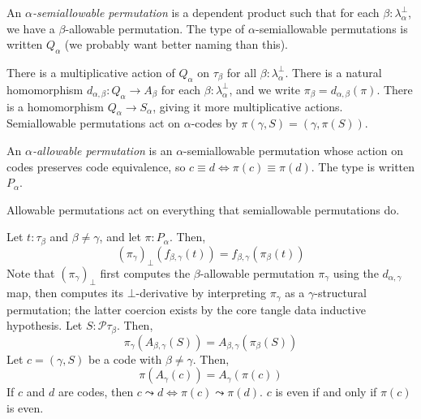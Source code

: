 \documentclass{article}
\begin{document}
\begin{definition}
    An \emph{\( \alpha \)-semiallowable permutation} is a dependent product such that for each \( \beta : \lambda^\bot_\alpha \), we have a \( \beta \)-allowable permutation.
    The type of \( \alpha \)-semiallowable permutations is written \( Q_\alpha \) (we probably want better naming than this).
\end{definition}
\begin{lemma}
    There is a multiplicative action of \( Q_\alpha \) on \( \tau_\beta \) for all \( \beta : \lambda^\bot_\alpha \).
    There is a natural homomorphism \( d_{\alpha,\beta} \colon Q_\alpha \to A_\beta \) for each \( \beta : \lambda^\bot_\alpha \), and we write \( \pi_\beta = d_{\alpha,\beta}(\pi) \).
    There is a homomorphism \( Q_\alpha \to S_\alpha \), giving it more multiplicative actions.
    Semiallowable permutations act on \( \alpha \)-codes by \( \pi(\gamma, S) = (\gamma, \pi(S)) \).
\end{lemma}
\begin{definition}
    An \emph{\( \alpha \)-allowable permutation} is an \( \alpha \)-semiallowable permutation whose action on codes preserves code equivalence, so \( c \equiv d \iff \pi(c) \equiv \pi(d) \).
    The type is written \( P_\alpha \).
\end{definition}
\begin{lemma}
    Allowable permutations act on everything that semiallowable permutations do.
\end{lemma}
\begin{theorem}
    Let \( t : \tau_\beta \) and \( \beta \neq \gamma \), and let \( \pi : P_\alpha \).
    Then,
    \[ (\pi_\gamma)_\bot(f_{\beta,\gamma}(t)) = f_{\beta,\gamma}(\pi_\beta(t)) \]
    Note that \( (\pi_\gamma)_\bot \) first computes the \( \beta \)-allowable permutation \( \pi_\gamma \) using the \( d_{\alpha,\gamma} \) map, then computes its \( \bot \)-derivative by interpreting \( \pi_\gamma \) as a \( \gamma \)-structural permutation; the latter coercion exists by the core tangle data inductive hypothesis.
    Let \( S : \mathcal P \tau_\beta \).
    Then,
    \[ \pi_\gamma(A_{\beta,\gamma}(S)) = A_{\beta,\gamma}(\pi_\beta(S)) \]
    Let \( c = (\gamma, S) \) be a code with \( \beta \neq \gamma \).
    Then,
    \[ \pi(A_\gamma(c)) = A_\gamma(\pi(c)) \]
    If \( c \) and \( d \) are codes, then \( c \leadsto d \iff \pi(c) \leadsto \pi(d) \).
    \( c \) is even if and only if \( \pi(c) \) is even.
\end{theorem}
\end{document}
